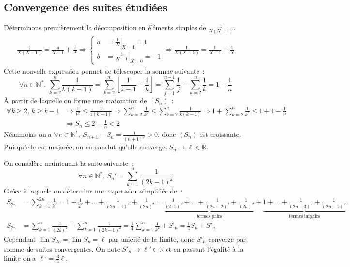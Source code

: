 \documentclass{article}
\begin{document}
  \subsection{Convergence des suites étudiées}
  Déterminons premièrement la décomposition en éléments simples de $\frac{1}{X(X-1)}$.
  \begin{align*}
    \frac{1}{X(X-1)} = \frac{a}{X-1} + \frac{b}{X} \Longrightarrow
    \left\{\begin{aligned}
    a &= \left.\frac{1}{X}\right|_{X=1} = 1 \\
    b &= \left.\frac{1}{X-1}\right|_{X=0} = -1
    \end{aligned}\right.
    \Longrightarrow \frac{1}{X(X-1)} = \frac{1}{X-1} - \frac{1}{X}
  \end{align*}
  Cette nouvelle expression permet de télescoper la somme suivante~:
  \[
  \forall n\in\mathbb{N}^*,\ \sum_{k=2}^n \frac{1}{k(k-1)}
  = \sum_{k=2}^n \left[\frac{1}{k-1} - \frac{1}{k}\right]
  =  \sum_{j=1}^{n-1} \frac{1}{j} - \sum_{k=2}^n \frac{1}{k} = 1 - \frac{1}{n}
  \]
  À partir de laquelle on forme une majoration de $(S_n)$~:
  \begin{align*}
    \forall k\geqslant 2,\ k \geqslant k - 1 &\Longrightarrow \frac{1}{k^2} \leqslant \frac{1}{k(k-1)}
    \Longrightarrow \sum_{k=2}^n \frac{1}{k^2} \leqslant \sum_{k=2}^n \frac{1}{k(k-1)}
    \Longrightarrow 1 + \sum_{k=2}^n \frac{1}{k^2} \leqslant 1 + 1 - \frac{1}{n} \\
    &\Longrightarrow S_n \leqslant 2 - \frac{1}{n} < 2
  \end{align*}
  Néanmoins on a $\forall n\in\mathbb{N}^*,\ S_{n+1} - S_n = \frac{1}{(n+1)^2} > 0$, donc $(S_n)$ est croissante. Puisqu'elle est majorée, on en conclut qu'elle converge. $\boxed{S_n \longrightarrow \ell \in\mathbb{R}}$.

  On considère maintenant la suite suivante~:
  \[
  \forall n\in\mathbb{N}^*,\ S_n' = \sum_{k=1}^n \frac{1}{(2k - 1)^2}
  \]
  Grâce à laquelle on détermine une expression simplifiée de~:
  \begin{align*}
    S_{2n} &= \sum_{k=1}^{2n} \frac{1}{k^2} = 1 + \frac{1}{2^2} + \dots + \frac{1}{(2n - 1)^2} + \frac{1}{(2n)^2} =
    \underbrace{\frac{1}{(2\cdot 1)^2} + \dots + \frac{1}{(2n - 2)^2} + \frac{1}{(2n)^2}}_{\text{termes pairs}}
    + \underbrace{1 + \dots + \frac{1}{(2n - 3)^2} + \frac{1}{(2n - 1)^2}}_{\text{termes impairs}} \\
    S_{2n} &= \sum_{k=1}^{n} \frac{1}{(2k)^2} + \sum_{k=1}^{n} \frac{1}{(2k - 1)^2}
    = \frac{1}{4}\sum_{k=1}^{n} \frac{1}{k^2} + S'_n = \frac{1}{4}S_n + S'_n
  \end{align*}
  Cependant $\lim S_{2n} = \lim S_n = \ell$ par unicité de la limite, donc $S'_n$ converge par somme de suites convergentes. On note $S'_n \longrightarrow \ell' \in\mathbb{R}$ et en passant l'égalité à la limite on a $\boxed{\ell' = \frac{3}{4}\ell}$.
\end{document}

